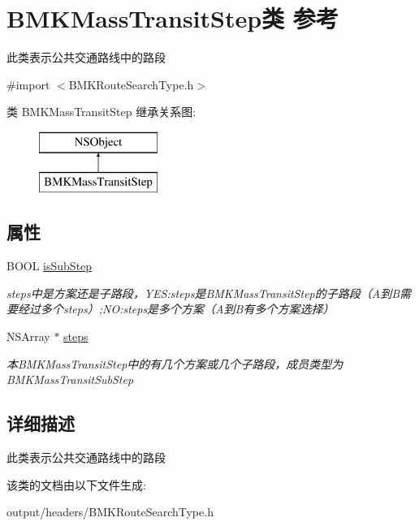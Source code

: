 \hypertarget{interface_b_m_k_mass_transit_step}{}\section{B\+M\+K\+Mass\+Transit\+Step类 参考}
\label{interface_b_m_k_mass_transit_step}


此类表示公共交通路线中的路段  




{\ttfamily \#import $<$B\+M\+K\+Route\+Search\+Type.\+h$>$}

类 B\+M\+K\+Mass\+Transit\+Step 继承关系图\+:\begin{figure}[H]
\begin{center}
\leavevmode
\includegraphics[height=2.000000cm]{interface_b_m_k_mass_transit_step}
\end{center}
\end{figure}
\subsection*{属性}
\begin{DoxyCompactItemize}
\item 
\hypertarget{interface_b_m_k_mass_transit_step_a6f19c27cf9772ce8f9f7692468806eef}{}B\+O\+O\+L \hyperlink{interface_b_m_k_mass_transit_step_a6f19c27cf9772ce8f9f7692468806eef}{is\+Sub\+Step}\label{interface_b_m_k_mass_transit_step_a6f19c27cf9772ce8f9f7692468806eef}

\begin{DoxyCompactList}\small\item\em steps中是方案还是子路段，\+Y\+E\+S\+:steps是\+B\+M\+K\+Mass\+Transit\+Step的子路段（\+A到\+B需要经过多个steps）;N\+O\+:steps是多个方案（\+A到\+B有多个方案选择） \end{DoxyCompactList}\item 
\hypertarget{interface_b_m_k_mass_transit_step_ad8fa3390dabf20772d993f4ec8a5e0be}{}N\+S\+Array $\ast$ \hyperlink{interface_b_m_k_mass_transit_step_ad8fa3390dabf20772d993f4ec8a5e0be}{steps}\label{interface_b_m_k_mass_transit_step_ad8fa3390dabf20772d993f4ec8a5e0be}

\begin{DoxyCompactList}\small\item\em 本\+B\+M\+K\+Mass\+Transit\+Step中的有几个方案或几个子路段，成员类型为\+B\+M\+K\+Mass\+Transit\+Sub\+Step \end{DoxyCompactList}\end{DoxyCompactItemize}


\subsection{详细描述}
此类表示公共交通路线中的路段 

该类的文档由以下文件生成\+:\begin{DoxyCompactItemize}
\item 
output/headers/B\+M\+K\+Route\+Search\+Type.\+h\end{DoxyCompactItemize}
